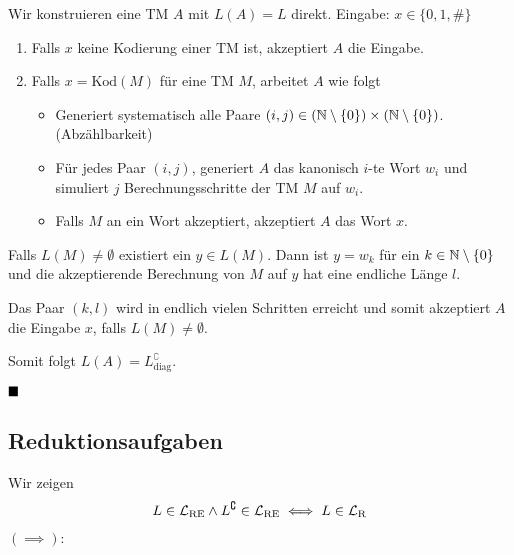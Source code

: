                 Wir konstruieren eine TM $A$ mit $L(A) = L$ direkt.
                Eingabe: $x \in \{0,1,\#\}$
                \begin{enumerate}[label=\Roman*.]
                    
                    \item Falls $x$ keine Kodierung einer TM ist, akzeptiert $A$ die Eingabe.
                    
                    \item Falls $x = \text{Kod}(M)$ für eine TM $M$, arbeitet $A$ wie folgt
                    \begin{itemize}[label=-]
                        \item Generiert systematisch alle Paare $(i, j) \in (\mathbb{N} \setminus \{0\}) \times (\mathbb{N} \setminus \{0\})$. (Abzählbarkeit)
                        \item Für jedes Paar $(i, j)$, generiert $A$ das kanonisch $i$-te Wort $w_i$ und simuliert $j$ Berechnungsschritte der TM $M$ auf $w_i$.
                        \item Falls $M$ an ein Wort akzeptiert, akzeptiert $A$ das Wort $x$.
                    \end{itemize}
                \end{enumerate}
            
                Falls $L(M) \neq \emptyset$ existiert ein $y \in L(M)$. Dann ist $y = w_k$ für ein $k \in \mathbb{N}\setminus\{0\}$ und die akzeptierende Berechnung von $M$ auf $y$ hat eine endliche Länge $l$.
            
                Das Paar $(k, l)$ wird in endlich vielen Schritten erreicht und somit akzeptiert $A$ die Eingabe $x$, falls $L(M) \neq \emptyset$.
            
                Somit folgt $L(A) = L_{\text{diag}}^\complement$.
            
                $\hfill\blacksquare$
            
                \subsection{Reduktionsaufgaben}
            
                Wir zeigen
                $$L \in \mathcal{L}_\text{RE} \land L^\complement \in \mathcal{L}_\text{RE} \iff L \in \mathcal{L}_\text{R}$$
            
                $\mathbf{(\implies):}$
                
